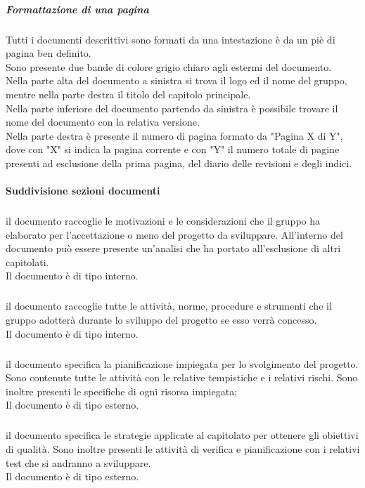 				\subparagraph{Formattazione di una pagina}
				Tutti i documenti descrittivi sono formati da una intestazione è da un piè di pagina ben definito.\\
				Sono presente due bande di colore grigio chiaro agli estermi del documento.\\
				Nella parte alta del documento a sinistra si trova il logo ed il nome del gruppo, mentre nella parte destra il titolo del capitolo principale.\\
				Nella parte inferiore del documento partendo da sinistra è possibile trovare il nome del documento con la relativa versione.\\
				Nella parte destra è presente il numero di pagina formato da "Pagina X di Y", dove con "X" si indica la pagina corrente e con "Y" il numero totale di pagine presenti ad esclusione della prima pagina, del diario delle revisioni e degli indici.

			\paragraph{Suddivisione sezioni documenti}

				\subparagraph{\docNameSdF} il documento raccoglie le motivazioni e le considerazioni che il gruppo ha elaborato per l'accettazione o meno del progetto da sviluppare. All'interno del documento può essere presente un'analisi che ha portato all'esclusione di altri capitolati.\\
				Il documento è di tipo interno.

				\subparagraph{\docNameNdP} il documento raccoglie tutte le attività, norme, procedure e strumenti che il gruppo adotterà durante lo sviluppo del progetto se esso verrà concesso.\\
				Il documento è di tipo interno.
				
				\subparagraph{\docNamePdP} il documento specifica la pianificazione impiegata per lo svolgimento del progetto. Sono contenute tutte le attività con le relative tempistiche e i relativi rischi. Sono inoltre presenti le specifiche di ogni risorsa impiegata;\\
				Il documento è di tipo esterno.

				\subparagraph{\docNamePdQ} il documento specifica le strategie applicate al capitolato per ottenere gli obiettivi di qualità. Sono inoltre presenti le attività di verifica e pianificazione con i relativi test che si andranno a sviluppare. \\
				Il documento è di tipo esterno.

